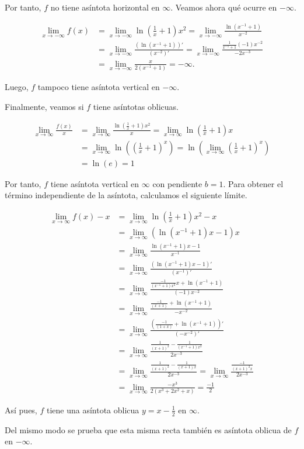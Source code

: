 \documentclass[
  spanish,
  a4paper,
]{scrreport}
\theoremstyle{definition}
\theoremstyle{remark}
\begin{document}
\begin{tcolorbox}
Por tanto, \(f\) no tiene asíntota horizontal en \(\infty\). Veamos
ahora qué ocurre en \(-\infty\).

\begin{align*}
\lim_{x\to -\infty} f(x) &= \lim_{x\to -\infty}\ln\left(\frac{1}{x}+1\right)x^2 = \lim_{x\to -\infty} \frac{\ln(x^{-1}+1)}{x^{-2}}\\ 
&= \lim_{x\to -\infty} \frac{(\ln(x^{-1}+1))'}{(x^{-2})'} \tag{L'Hôpital} = \lim_{x\to -\infty} \frac{\frac{1}{x^{-1}+1}(-1)x^{-2}}{-2x^{-3}}\\ 
&= \lim_{x\to -\infty} \frac{x}{2(x^{-1}+1)} = -\infty.
\end{align*}

Luego, \(f\) tampoco tiene asíntota vertical en \(-\infty\).

Finalmente, veamos si \(f\) tiene asíntotas oblicuas.

\begin{align*}
\lim_{x\to \infty} \frac{f(x)}{x} &= \lim_{x\to \infty}\frac{\ln\left(\frac{1}{x}+1\right)x^2}{x} = \lim_{x\to \infty}\ln\left(\frac{1}{x}+1\right)x \\
&= \lim_{x\to \infty} \ln\left(\left(\frac{1}{x}+1\right)^x\right) = \ln\left(\lim_{x\to \infty} \left(\frac{1}{x}+1\right)^x\right)\\ 
&= \ln(e)=1
\end{align*}

Por tanto, \(f\) tiene asíntota vertical en \(\infty\) con pendiente
\(b=1\). Para obtener el término independiente de la asíntota,
calculamos el siguiente límite.

\begin{align*}
\lim_{x\to \infty} f(x)-x &= \lim_{x\to \infty}\ln\left(\frac{1}{x}+1\right)x^2-x\\  
&= \lim_{x\to \infty}(\ln(x^{-1}+1)x-1)x \\
&= \lim_{x\to \infty}\frac{\ln(x^{-1}+1)x-1}{x^{-1}}\\  
&=  \lim_{x\to \infty}\frac{(\ln(x^{-1}+1)x-1)'}{(x^{-1})'} \tag{L'Hôpital} \\
&= \lim_{x\to \infty}\frac{\frac{-1}{(x^{-1}+1)x^2}x+\ln(x^{-1}+1)}{(-1)x^{-2}}\\ 
&= \lim_{x\to \infty}\frac{\frac{-1}{(x+1)}+\ln(x^{-1}+1)}{-x^{-2}} \\
&= \lim_{x\to \infty}\frac{\left(\frac{-1}{(1+x)}+\ln(x^{-1}+1)\right)'}{(-x^{-2})'}\\ 
&= \lim_{x\to \infty}\frac{\frac{1}{(x+1)^2}-\frac{1}{(x^{-1}+1)x^2}}{2x^{-3}}\tag{L'Hôpital}\\ 
&= \lim_{x\to \infty}\frac{\frac{1}{(x+1)^2}-\frac{1}{(x+1)x}}{2x^{-3}} = \lim_{x\to \infty}\frac{\frac{-1}{(x+1)^2x}}{2x^{-3}} \\
&= \lim_{x\to \infty}\frac{-x^3}{2(x^3+2x^2+x)} = \frac{-1}{2}
\end{align*}

Así pues, \(f\) tiene una asíntota oblicua \(y=x-\frac{1}{2}\) en
\(\infty\).

Del mismo modo se prueba que esta misma recta también es asíntota
oblicua de \(f\) en \(-\infty\).

\end{tcolorbox}
\end{document}
